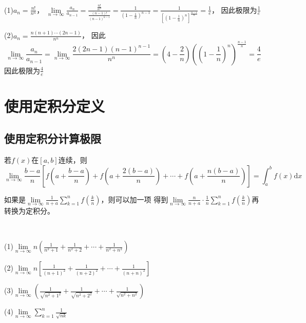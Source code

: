\begin{solution}
  (1)$a_n = \frac{n!}{n^n}$，
  $\lim \limits _{n \rightarrow \infty} \frac{a_n}{a_{n-1}} = \frac{\frac{n!}{n^n}}{\frac{(n-1)!}{(n-1)^{n-1}}} = \frac{1}{(1 - \frac{1}{n})^{n-1}} = \frac{1}{\left[(1 - \frac{1}{n})^n\right]^{\frac{n-1}{n}}} = \frac{1}{e}$，
  因此极限为$\frac{1}{e}$

  (2)$a_n = \frac{n(n+1)\cdots (2n-1)}{n^n}$，
  因此
  \begin{equation*}
    \lim \limits _{n \rightarrow \infty} \frac{a_n}{a_{n-1}} = \lim \limits _{n \rightarrow \infty} \frac{2(2n-1)(n-1)^{n-1}}{n^n} = (4 - \frac{2}{n}) \left( (1 - \frac{1}{n})^n \right)^{\frac{n-1}{n} } = \frac{4}{e}
  \end{equation*}
  因此极限为$\frac{4}{e}$
\end{solution}


\section{使用定积分定义}

\subsection{使用定积分计算极限}

\begin{theorem}[用定积分定义计算极限]
  若$f(x)$在$[a,b]$连续，则
  \begin{equation*}
    \lim \limits _{n \rightarrow \infty} \frac{b - a}{n} \left[ f \left( a + \frac{b-a}{n} \right) + f \left( a + \frac{2(b-a)}{n} \right) + \cdots + f \left( a + \frac{n(b-a)}{n} \right) \right] = \int_a^b f(x) \mathrm{d} x
  \end{equation*}
\end{theorem}

\begin{note}
  如果是$\lim \limits _{n \rightarrow \infty} \frac{1}{n+a}\sum\limits_{k = 1}^n f \left( \frac{k}{n} \right)$，则可以加一项
  得到$\lim \limits _{n \rightarrow \infty} \frac{n}{n+a} \cdot \frac{1}{n} \sum\limits_{k = 1}^n f \left( \frac{k}{n} \right)$再转换为定积分。
\end{note}

~

\begin{exercise}[直接判断积分]
  (1)$\lim \limits _{n \rightarrow \infty} n \left( \frac{1}{n^2 + 1} + \frac{1}{n^2 + 2} + \cdots + \frac{1}{n^2 + n^2} \right)$

  (2)$\lim \limits _{n \rightarrow \infty} n \left[ \frac{1}{(n+1)^2} + \frac{1}{(n+2)^2} + \cdots + \frac{1}{(n+n)^2} \right]$

  (3)$\lim \limits _{n \rightarrow \infty}  \left( \frac{1}{\sqrt{n^2 + 1^2}} + \frac{1}{\sqrt{n^2 + 2^2}} + \cdots + \frac{1}{\sqrt{n^2 + n^2}} \right)$
  
  (4)$\lim \limits _{n \rightarrow \infty} \sum\limits_{k = 1}^n \frac{1}{\sqrt{nk}}$
\end{exercise}

